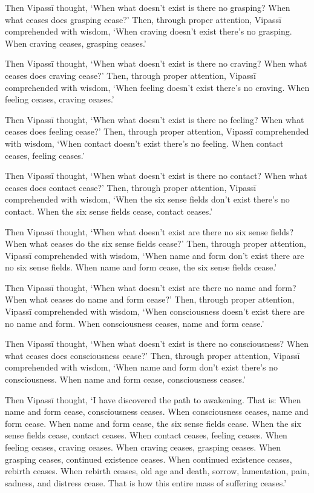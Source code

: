 \documentclass[12pt,openany]{book}%
\begin{document}
Then \textsanskrit{Vipassī} thought, ‘When what doesn’t exist is there no grasping? When what ceases does grasping cease?’ Then, through proper attention, \textsanskrit{Vipassī} comprehended with wisdom, ‘When craving doesn’t exist there’s no grasping. When craving ceases, grasping ceases.’ 

Then \textsanskrit{Vipassī} thought, ‘When what doesn’t exist is there no craving? When what ceases does craving cease?’ Then, through proper attention, \textsanskrit{Vipassī} comprehended with wisdom, ‘When feeling doesn’t exist there’s no craving. When feeling ceases, craving ceases.’ 

Then \textsanskrit{Vipassī} thought, ‘When what doesn’t exist is there no feeling? When what ceases does feeling cease?’ Then, through proper attention, \textsanskrit{Vipassī} comprehended with wisdom, ‘When contact doesn’t exist there’s no feeling. When contact ceases, feeling ceases.’ 

Then \textsanskrit{Vipassī} thought, ‘When what doesn’t exist is there no contact? When what ceases does contact cease?’ Then, through proper attention, \textsanskrit{Vipassī} comprehended with wisdom, ‘When the six sense fields don’t exist there’s no contact. When the six sense fields cease, contact ceases.’ 

Then \textsanskrit{Vipassī} thought, ‘When what doesn’t exist are there no six sense fields? When what ceases do the six sense fields cease?’ Then, through proper attention, \textsanskrit{Vipassī} comprehended with wisdom, ‘When name and form don’t exist there are no six sense fields. When name and form cease, the six sense fields cease.’ 

Then \textsanskrit{Vipassī} thought, ‘When what doesn’t exist are there no name and form? When what ceases do name and form cease?’ Then, through proper attention, \textsanskrit{Vipassī} comprehended with wisdom, ‘When consciousness doesn’t exist there are no name and form. When consciousness ceases, name and form cease.’ 

Then \textsanskrit{Vipassī} thought, ‘When what doesn’t exist is there no consciousness? When what ceases does consciousness cease?’ Then, through proper attention, \textsanskrit{Vipassī} comprehended with wisdom, ‘When name and form don’t exist there’s no consciousness. When name and form cease, consciousness ceases.’ 

Then \textsanskrit{Vipassī} thought, ‘I have discovered the path to awakening. That is: When name and form cease, consciousness ceases. When consciousness ceases, name and form cease. When name and form cease, the six sense fields cease. When the six sense fields cease, contact ceases. When contact ceases, feeling ceases. When feeling ceases, craving ceases. When craving ceases, grasping ceases. When grasping ceases, continued existence ceases. When continued existence ceases, rebirth ceases. When rebirth ceases, old age and death, sorrow, lamentation, pain, sadness, and distress cease. That is how this entire mass of suffering ceases.’ 
\end{document}
